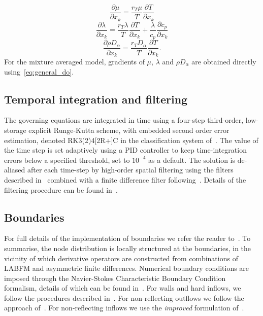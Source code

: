 \documentclass[notitlepage]{revtex4-1}
\begin{document}
\begin{equation}\frac{\partial\mu}{\partial{x}_{k}}=\frac{r_{T}\mu}{T}\frac{\partial{T}}{\partial{x}_{k}}\end{equation}
\begin{equation}\frac{\partial\lambda}{\partial{x}_{k}}=\frac{r_{T}\lambda}{T}\frac{\partial{T}}{\partial{x}_{k}}+\frac{\lambda}{c_{p}}\frac{\partial{c_{p}}}{\partial{x}_{k}}\end{equation}
\begin{equation}\frac{\partial\rho{D}_{\alpha}}{\partial{x}_{k}}=\frac{r_{T}D_{\alpha}}{T}\frac{\partial{T}}{\partial{x}_{k}}.\end{equation}
For the mixture averaged model, gradients of $\mu$, $\lambda$ and $\rho{D}_{\alpha}$ are obtained directly using~\eqref{eq:general_do}.

\subsection{Temporal integration and filtering}

The governing equations are integrated in time using a four-step third-order, low-storage explicit Runge-Kutta scheme, with embedded second order error estimation, denoted RK3(2)4[2R+]C in the classification system of~\citet{kennedy_2000}. The value of the time step is set adaptively using a PID controller to keep time-integration errors below a specified threshold, set to $10^{-4}$ as a default. The solution is de-aliased after each time-step by high-order spatial filtering using the filters described in~\cite{king_2022} combined with a finite difference filter following~\cite{kennedy_1994}. Details of the filtering procedure can be found in~\cite{king_2024}.


\subsection{Boundaries}

For full details of the implementation of boundaries we refer the reader to~\cite{king_2022,king_2024}. To summarise, the node distribution is locally structured at the boundaries, in the vicinity of which derivative operators are constructed from combinations of LABFM and asymmetric finite differences. Numerical boundary conditions are imposed through the Navier-Stokes Characteristic Boundary Condition formalism, details of which can be found in~\cite{poinsot_2005,sutherland_2003,yoo_2007}. For walls and hard inflows, we follow the procedures described in~\cite{poinsot_2005}. For non-reflecting outflows we follow the approach of~\cite{sutherland_2003}. For non-reflecting inflows we use the \emph{improved} formulation of~\cite{yoo_2007}.
\end{document}
